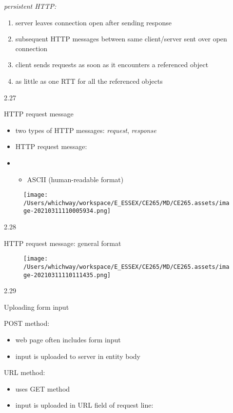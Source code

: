 \documentclass[
]{article}
\begin{document}
\emph{persistent HTTP:}

\begin{enumerate}
\def\labelenumi{\arabic{enumi}.}
\item
  server leaves connection open after sending response
\item
  subsequent HTTP messages between same client/server sent over open
  connection
\item
  client sends requests as soon as it encounters a referenced object
\item
  as little as one RTT for all the referenced objects
\end{enumerate}

2.27

HTTP request message

\begin{itemize}
\item
  two types of HTTP messages: \emph{request}, \emph{response}
\item
  HTTP request message:
\item
  \begin{itemize}
  \item
    ASCII (human-readable format)
  \end{itemize}
\end{itemize}

\begin{figure}
\centering
\texttt{[image: /Users/whichway/workspace/E\_ESSEX/CE265/MD/CE265.assets/image-20210311110005934.png]}
\caption{}
\end{figure}

2.28

HTTP request message: general format

\begin{figure}
\centering
\texttt{[image: /Users/whichway/workspace/E\_ESSEX/CE265/MD/CE265.assets/image-20210311110111435.png]}
\caption{}
\end{figure}

2.29

Uploading form input

POST method:

\begin{itemize}
\item
  web page often includes form input
\item
  input is uploaded to server in entity body
\end{itemize}

URL method:

\begin{itemize}
\item
  uses GET method
\item
  input is uploaded in URL field of request line:
\end{itemize}
\end{document}
